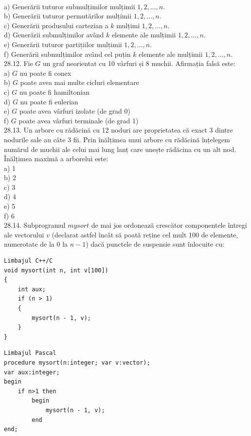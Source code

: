 \\
a) Generării tuturor submulțimilor mulțimii ${1,2, \ldots, n}$.
\\
b) Generării tuturor permutărilor mulțimii ${1,2, \ldots, n}$.
\\
c) Generării produsului cartezian a $k$ mulțimi ${1,2, \ldots, n}$.
\\
d) Generării submulțimilor având $k$ elemente ale mulțimii ${1,2, \ldots, n}$.
\\
e) Generării tuturor partițiilor mulțimii ${1,2, \ldots, n}$.
\\
f) Generării submulțimilor având cel puțin $k$ elemente ale mulțimii ${1,2, \ldots, n}$.
\\
28.12. Fie $G$ un graf neorientat cu 10 vârfuri și 8 muchii. Afirmația falsă este:
\\
a) $G$ nu poate fi conex
\\
b) $G$ poate avea mai multe cicluri elementare
\\
c) $G$ nu poate fi hamiltonian
\\
d) $G$ nu poate fi eulerian
\\
e) $G$ poate avea vârfuri izolate (de grad 0)
\\
f) $G$ poate avea vârfuri terminale (de grad 1)
\\
28.13. Un arbore cu rădăcină cu 12 noduri are proprietatea că exact 3 dintre nodurile sale au câte 3 fii. Prin înălțimea unui arbore cu rădăcină înțelegem numărul de muchii ale celui mai lung lanț care unește rădăcina cu un alt nod. Înălțimea maximă a arborelui este:
\\
a) 1
\\
b) 2
\\
c) 3
\\
d) 4
\\
e) 5
\\
f) 6
\\
28.14. Subprogramul $mysort$ de mai jos ordonează crescător componentele întregi ale vectorului $v$ (declarat astfel încât să poată reține cel mult 100 de elemente, numerotate de la $0$ la $n-1$) dacă punctele de suspensie sunt înlocuite cu:
\begin{verbatim}
Limbajul C++/C
void mysort(int n, int v[100])
{
    int aux;
    if (n > 1)
    {
        mysort(n - 1, v);
    }
}
\end{verbatim}
\begin{verbatim}
Limbajul Pascal
procedure mysort(n:integer; var v:vector);
var aux:integer;
begin
    if n>1 then
        begin
            mysort(n - 1, v);
        end
end;
\end{verbatim}
